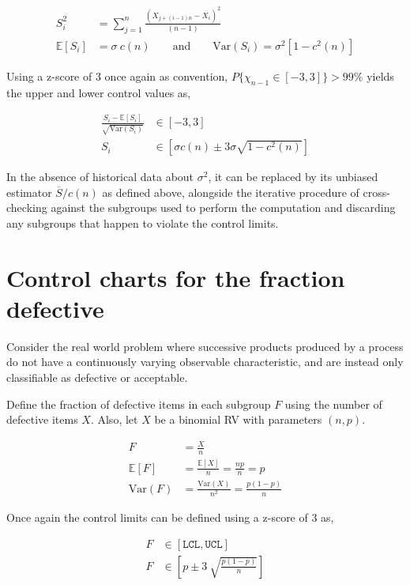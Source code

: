 \begin{align}
	S_i^2 &= \sum\limits_{j = 1}^{n} \frac{(X_{j + (i-1)n} - \overline{X_i})^2}{(n-1)} \\ \nonumber 
	\mathbb{E}[S_i] &= \sigma\ c(n) \qquad \text{and} \qquad \mathrm{Var}(S_i) = \sigma^2 [1 - c^2(n)]
\end{align}

Using a z-score of 3 once again as convention, $ P\{\chi_{n-1} \in [-3, 3]\} > 99\% $ yields the upper and lower control values as, 

\begin{align}
	\frac{S_i - \mathbb{E}[S_i]}{\sqrt{\mathrm{Var}(S_i)}} &\in [-3, 3] \\
	S_i &\in [\sigma c(n) \pm 3 \sigma \sqrt{1 - c^2(n)}]
\end{align} 

In the absence of historical data about $ \sigma^2 $, it can be replaced by its unbiased estimator $ \overline{S} / c(n) $ as defined above, alongside the iterative procedure of cross-checking against the subgroups used to perform the computation and discarding any subgroups that happen to violate the control limits.

\section{Control charts for the fraction defective}

Consider the real world problem where successive products produced by a process do not have a continuously varying observable characteristic, and are instead only classifiable as defective or acceptable.

Define the fraction of defective items in each subgroup $ F $ using the number of defective items $ X $. Also, let $ X $ be a binomial RV with parameters $ (n, p) $.

\begin{align}
	F &= \frac{X}{n} \\[1ex]
	\mathbb{E}[F] &= \frac{\mathbb{E}[X]}{n} = \frac{np}{n} = p \\[1ex]
	\mathrm{Var}(F) &= \frac{\mathrm{Var}(X)}{n^2} = \frac{p(1-p)}{n}
\end{align}

Once again the control limits can be defined using a z-score of 3 as,

\begin{align}
	F &\in [\texttt{LCL}, \texttt{UCL}] \nonumber \\
	F &\in \left[p \pm 3\ \sqrt{\frac{p(1-p)}{n}}\right]
\end{align}

